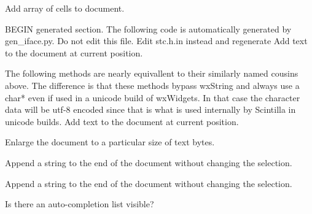 
Add array of cells to document.


\label{wxstyledtextctrladdtext}



BEGIN generated section.  The following code is automatically generated
by gen\_iface.py.  Do not edit this file.  Edit stc.h.in instead
and regenerate
Add text to the document at current position.


\label{wxstyledtextctrladdtextraw}


The following methods are nearly equivallent to their similarly named
cousins above.  The difference is that these methods bypass wxString
and always use a char* even if used in a unicode build of wxWidgets.
In that case the character data will be utf-8 encoded since that is
what is used internally by Scintilla in unicode builds.
Add text to the document at current position.


\label{wxstyledtextctrlallocate}


Enlarge the document to a particular size of text bytes.


\label{wxstyledtextctrlappendtext}


Append a string to the end of the document without changing the selection.


\label{wxstyledtextctrlappendtextraw}


Append a string to the end of the document without changing the selection.


\label{wxstyledtextctrlautocompactive}


Is there an auto-completion list visible?


\label{wxstyledtextctrlautocompcancel}

